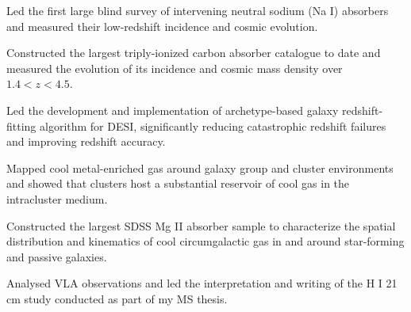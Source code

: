 

Led the first large blind survey of intervening neutral sodium (Na I) absorbers and measured their low-redshift incidence and cosmic evolution.


Constructed the largest triply-ionized carbon absorber catalogue to date and measured the evolution of its incidence and cosmic mass density over $1.4<z<4.5$.


Led the development and implementation of archetype-based galaxy redshift-fitting algorithm for DESI, significantly reducing catastrophic redshift failures and improving redshift accuracy.


Mapped cool metal-enriched gas around galaxy group and cluster environments and showed that clusters host a substantial reservoir of cool gas in the intracluster medium.


Constructed the largest SDSS Mg II absorber sample to characterize the spatial distribution and kinematics of cool circumgalactic gas in and around star-forming and passive galaxies.


Analysed VLA observations and led the interpretation and writing of the H I 21 cm study conducted as part of my MS thesis.
